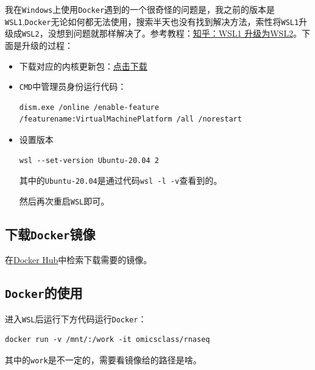 \documentclass[
]{book}
\begin{document}
我在\texttt{Windows}上使用\texttt{Docker}遇到的一个很奇怪的问题是，我之前的版本是\texttt{WSL1},\texttt{Docker}无论如何都无法使用，搜索半天也没有找到解决方法，索性将\texttt{WSL1}升级成\texttt{WSL2}，没想到问题就那样解决了。参考教程：\href{https://zhuanlan.zhihu.com/p/356397851}{知乎：WSL1 升级为WSL2}。下面是升级的过程：

\begin{itemize}
\item
  下载对应的内核更新包：\href{https://link.zhihu.com/?target=https\%3A//wslstorestorage.blob.core.windows.net/wslblob/wsl_update_x64.msi}{点击下载}
\item
  \texttt{CMD}中管理员身份运行代码：

\begin{verbatim}
dism.exe /online /enable-feature /featurename:VirtualMachinePlatform /all /norestart
\end{verbatim}
\item
  设置版本

\begin{verbatim}
wsl --set-version Ubuntu-20.04 2
\end{verbatim}

  其中的\texttt{Ubuntu-20.04}是通过代码\texttt{wsl\ -l\ -v}查看到的。

  然后再次重启\texttt{WSL}即可。
\end{itemize}

\hypertarget{ux4e0bux8f7ddockerux955cux50cf}{%
\subsection{\texorpdfstring{下载\texttt{Docker}镜像}{下载Docker镜像}}\label{ux4e0bux8f7ddockerux955cux50cf}}

在\href{https://hub.docker.com/}{Docker Hub}中检索下载需要的镜像。

\hypertarget{dockerux7684ux4f7fux7528-1}{%
\subsection{\texorpdfstring{\texttt{Docker}的使用}{Docker的使用}}\label{dockerux7684ux4f7fux7528-1}}

进入\texttt{WSL}后运行下方代码运行\texttt{Docker}：

\begin{verbatim}
docker run -v /mnt/:/work -it omicsclass/rnaseq
\end{verbatim}

其中的\texttt{work}是不一定的，需要看镜像给的路径是啥。
\end{document}
